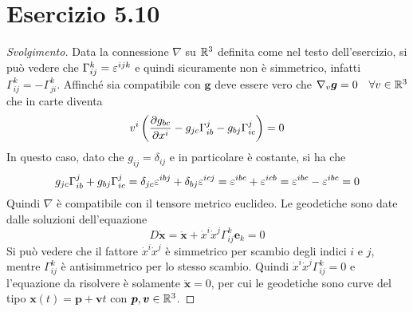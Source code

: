 \documentclass[italian,a4paper,10pt]{article}
\begin{document}
\section*{Esercizio 5.10}
\begin{proof}[Svolgimento]
Data la connessione $\nabla$ su $\mathbb R^3$ definita come nel testo dell'esercizio, si può vedere che $\Gamma^k_{ij}=\varepsilon^{ijk}$ e quindi sicuramente non è simmetrico, infatti $\Gamma^k_{ij} = -\Gamma^k_{ji}$. 
Affinché sia compatibile con $\bm{g}$ deve essere vero che $\nabla_v \bm{g} = 0 \quad \forall v \in \mathbb R^3$ che in carte diventa $$v^i \left(\pdv{g_{bc}}{x^i} - g_{jc}\Gamma^j_{ib} - g_{bj}\Gamma^j_{ic}\right)=0$$
In questo caso, dato che $g_{ij}=\delta_{ij}$ e in particolare è costante, si ha che
\begin{equation*}
g_{jc}\Gamma^j_{ib} + g_{bj}\Gamma^j_{ic} = \delta_{jc}\varepsilon^{ibj} + \delta_{bj}\varepsilon^{icj} = \varepsilon^{ibc}+\varepsilon^{icb} = \varepsilon^{ibc}-\varepsilon^{ibc} = 0
\end{equation*}
Quindi $\nabla$ è compatibile con il tensore metrico euclideo. 
Le geodetiche sono date dalle soluzioni dell'equazione $$D\dot{\bm{x}}= \ddot{\bm{x}} + \dot{x}^i\dot{x}^j\Gamma^k_{ij}\bm{e}_k=0$$
Si può vedere che il fattore $\dot{x}^i\dot{x}^j$ è simmetrico per scambio degli indici $i$ e $j$, mentre $\Gamma^k_{ij}$ è antisimmetrico per lo stesso scambio. Quindi $\dot{x}^i\dot{x}^j\Gamma^k_{ij}=0$ e l'equazione da risolvere è solamente $\ddot{\bm{x}}=0$, per cui le geodetiche sono curve del tipo $\bm{x}(t)=\bm{p}+\bm{v}t$ con $\bm{p},\bm{v} \in \mathbb R^3$.
\end{proof}
\end{document}
